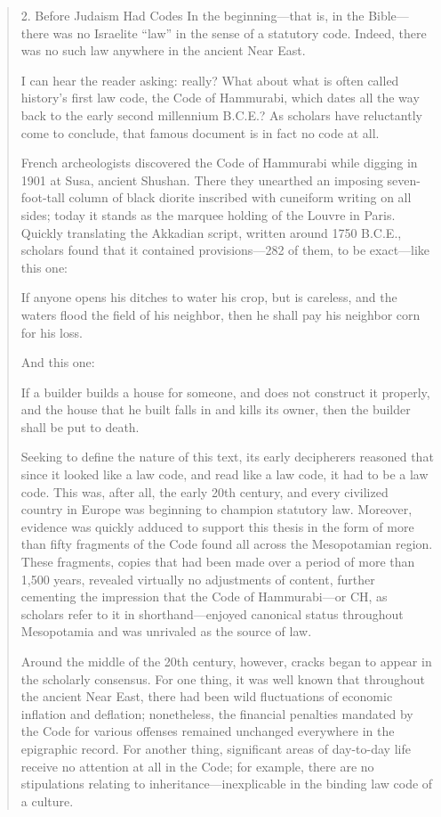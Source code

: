 \documentclass[11pt]{article}
\begin{document}
\begin{quote}
2. Before Judaism Had Codes
In the beginning—that is, in the Bible—there was no Israelite “law” in the sense of a statutory code. Indeed, there was no such law anywhere in the ancient Near East.

I can hear the reader asking: really? What about what is often called history’s first law code, the Code of Hammurabi, which dates all the way back to the early second millennium B.C.E.? As scholars have reluctantly come to conclude, that famous document is in fact no code at all.

French archeologists discovered the Code of Hammurabi while digging in 1901 at Susa, ancient Shushan. There they unearthed an imposing seven-foot-tall column of black diorite inscribed with cuneiform writing on all sides; today it stands as the marquee holding of the Louvre in Paris. Quickly translating the Akkadian script, written around 1750 B.C.E., scholars found that it contained provisions—282 of them, to be exact—like this one:

If anyone opens his ditches to water his crop, but is careless, and the waters flood the field of his neighbor, then he shall pay his neighbor corn for his loss.

And this one:

If a builder builds a house for someone, and does not construct it properly, and the house that he built falls in and kills its owner, then the builder shall be put to death.

Seeking to define the nature of this text, its early decipherers reasoned that since it looked like a law code, and read like a law code, it had to be a law code. This­ was, after all, the early 20th century, and every civilized country in Europe was beginning to champion statutory law. Moreover, evidence was quickly adduced to support this thesis in the form of more than fifty fragments of the Code found all across the Mesopotamian region. These fragments, copies that had been made over a period of more than 1,500 years, revealed virtually no adjustments of content, further cementing the impression that the Code of Hammurabi—or CH, as scholars refer to it in shorthand—enjoyed canonical status throughout Mesopotamia and was unrivaled as the source of law.

Around the middle of the 20th century, however, cracks began to appear in the scholarly consensus. For one thing, it was well known that throughout the ancient Near East, there had been wild fluctuations of economic inflation and deflation; nonetheless, the financial penalties mandated by the Code for various offenses remained unchanged everywhere in the epigraphic record. For another thing, significant areas of day-to-day life receive no attention at all in the Code; for example, there are no stipulations relating to inheritance—inexplicable in the binding law code of a culture. 


\end{quote}
\end{document}
